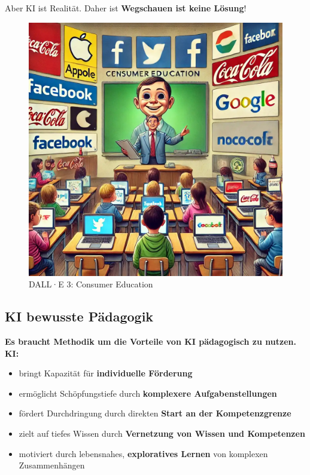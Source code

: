 \documentclass[
  letterpaper,
  DIV=11,
  numbers=noendperiod]{scrartcl}
\providecommand{\tightlist}{%
  \setlength{\itemsep}{0pt}\setlength{\parskip}{0pt}}\usepackage{longtable,booktabs,array}
\begin{document}
Aber KI ist Realität. Daher ist \textbf{Wegschauen ist keine Lösung}!

\begin{figure}[H]

{\centering \includegraphics[width=1\textwidth,height=\textheight]{images/consumer_education1.webp}

}

\caption{DALL·E 3: Consumer Education}

\end{figure}%

\subsection{KI bewusste Pädagogik}\label{ki-bewusste-puxe4dagogik}

\textbf{Es braucht Methodik um die Vorteile von KI pädagogisch zu
nutzen. KI: }

\begin{itemize}
\tightlist
\item
  bringt Kapazität für {\textbf{individuelle Förderung}}
\item
  ermöglicht Schöpfungstiefe durch {\textbf{komplexere
  Aufgabenstellungen}}
\item
  fördert Durchdringung durch direkten {\textbf{Start an der
  Kompetenzgrenze}}
\item
  zielt auf tiefes Wissen durch {\textbf{Vernetzung von Wissen und
  Kompetenzen}}
\item
  motiviert durch lebensnahes, {\textbf{exploratives Lernen}} von
  komplexen Zusammenhängen
\end{itemize}
\end{document}
